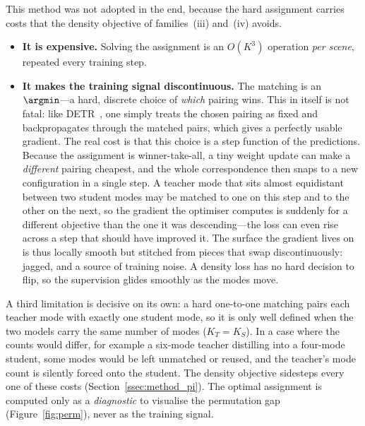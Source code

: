 This method was not adopted in the end, because the hard assignment carries costs that
the density objective of families~(iii) and~(iv) avoids.
\begin{itemize}
  \item \textbf{It is expensive.} Solving the assignment is an $O(K^3)$ operation
    \emph{per scene}, repeated every training step.
  \item \textbf{It makes the training signal discontinuous.} The matching is an
    $\argmin$---a hard, discrete choice of \emph{which} pairing wins. This in itself
    is not fatal: like DETR~\cite{carion2020detr}, one simply treats the chosen
    pairing as fixed and backpropagates through the matched pairs, which gives a
    perfectly usable gradient. The real cost is that this choice is a step function
    of the predictions. Because the assignment is winner-take-all, a tiny weight
    update can make a \emph{different} pairing cheapest, and the whole correspondence
    then snaps to a new configuration in a single step. A teacher mode that sits
    almost equidistant between two student modes may be matched to one on this step
    and to the other on the next, so the gradient the optimiser computes is suddenly
    for a different objective than the one it was descending---the loss can even rise
    across a step that should have improved it. The surface the gradient lives on is
    thus locally smooth but stitched from pieces that swap discontinuously: jagged,
    and a source of training noise. A density loss has no hard decision to flip, so
    the supervision glides smoothly as the modes move.
\end{itemize}
A third limitation is decisive on its own: a hard one-to-one matching pairs each
teacher mode with exactly one student mode, so it is only well defined when the two
models carry the same number of modes ($K_T=K_S$). In a case where the counts would
differ, for example a six-mode teacher distilling into a four-mode student,
some modes would be left
unmatched or reused, and the teacher's mode count is silently forced onto the student. 
The density objective sidesteps every one of these costs (Section~\ref{ssec:method_pi}).
The optimal assignment is computed only as a \emph{diagnostic}
to visualise the permutation gap (Figure~\ref{fig:perm}), never as the training
signal.

